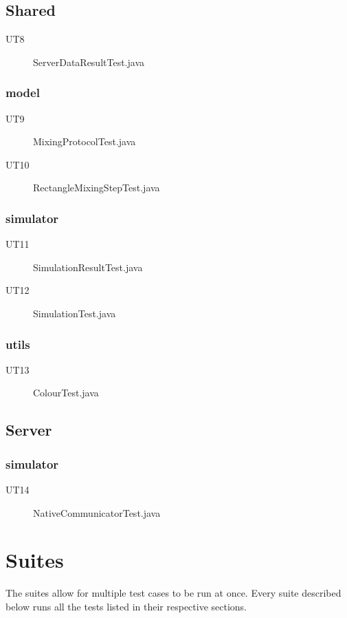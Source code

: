\subsection{Shared}
\begin{description}
\item[UT8] ServerDataResultTest.java
\end{description}
\subsubsection{model}
\begin{description}
\item[UT9] MixingProtocolTest.java
\item[UT10] RectangleMixingStepTest.java
\end{description}
\subsubsection{simulator}
\begin{description}
\item[UT11] SimulationResultTest.java
\item[UT12] SimulationTest.java
\end{description}
\subsubsection{utils}
\begin{description}
\item[UT13] ColourTest.java
\end{description}

\subsection{Server}
\subsubsection{simulator}
\begin{description}
\item[UT14] NativeCommunicatorTest.java
\end{description}

\section{Suites}
The suites allow for multiple test cases to be run at once. Every suite described below runs all the tests listed in their respective sections.


